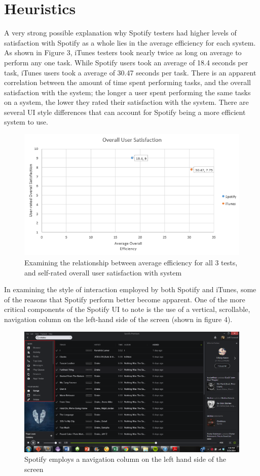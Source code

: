 \documentclass[12pt]{article}
\begin{document}
\section{Heuristics}

A very strong possible explanation why Spotify testers had higher 
levels of satisfaction with Spotify as a whole lies in the average 
efficiency for each system. As shown in Figure 3, iTunes testers 
took nearly twice as long on average to perform any one task. 
While Spotify users took an average of 18.4 seconds per task, 
iTunes users took a average of 30.47 seconds per task. There is an 
apparent correlation between the amount of time spent performing 
tasks, and the overall satisfaction with the system; the longer a 
user spent performing the same tasks on a system, the lower they 
rated their satisfaction with the system. There are several UI 
style differences that can account for Spotify being a more 
efficient system to use.

\begin{figure}[H]
	\centering
	\includegraphics[width=.75\textwidth]{chart3.png}
	\caption{Examining the relationship between average 
efficiency for all 3 tests, and self-rated overall user 
satisfaction with system}
\end{figure}

In examining the style of interaction employed by both Spotify and 
iTunes, some of the reasons that Spotify perform better become 
apparent. One of the more critical components of the Spotify UI to 
note is the use of a vertical, scrollable, navigation column on 
the left-hand side of the screen (shown in figure 4). 

\begin{figure}[H]
	\centering
	\includegraphics[width=\textwidth]{chart4.png}
	\caption{Spotify employs a navigation column on the left 
hand side of the screen}
\end{figure}
\end{document}
